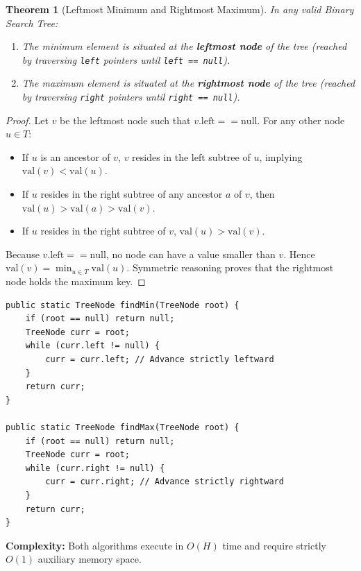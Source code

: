 \documentclass[10pt,journal,compsoc,onecolumn]{IEEEtran}
\newtheorem{theorem}{Theorem}
\begin{document}
\begin{theorem}[Leftmost Minimum and Rightmost Maximum]
In any valid Binary Search Tree:
\begin{enumerate}
    \item The minimum element is situated at the \textbf{leftmost node} of the tree (reached by traversing \texttt{left} pointers until \texttt{left == null}).
    \item The maximum element is situated at the \textbf{rightmost node} of the tree (reached by traversing \texttt{right} pointers until \texttt{right == null}).
\end{enumerate}
\end{theorem}
\begin{proof}
Let $v$ be the leftmost node such that $v.\mathrm{left} == \mathrm{null}$. For any other node $u \in T$:
\begin{itemize}
    \item If $u$ is an ancestor of $v$, $v$ resides in the left subtree of $u$, implying $\mathrm{val}(v) < \mathrm{val}(u)$.
    \item If $u$ resides in the right subtree of any ancestor $a$ of $v$, then $\mathrm{val}(u) > \mathrm{val}(a) > \mathrm{val}(v)$.
    \item If $u$ resides in the right subtree of $v$, $\mathrm{val}(u) > \mathrm{val}(v)$.
\end{itemize}
Because $v.\mathrm{left} == \mathrm{null}$, no node can have a value smaller than $v$. Hence $\mathrm{val}(v) = \min_{u \in T} \mathrm{val}(u)$. Symmetric reasoning proves that the rightmost node holds the maximum key.
\end{proof}

\begin{verbatim}
public static TreeNode findMin(TreeNode root) {
    if (root == null) return null;
    TreeNode curr = root;
    while (curr.left != null) {
        curr = curr.left; // Advance strictly leftward
    }
    return curr;
}

public static TreeNode findMax(TreeNode root) {
    if (root == null) return null;
    TreeNode curr = root;
    while (curr.right != null) {
        curr = curr.right; // Advance strictly rightward
    }
    return curr;
}
\end{verbatim}

\textbf{Complexity:} Both algorithms execute in $O(H)$ time and require strictly $O(1)$ auxiliary memory space.

\end{document}

